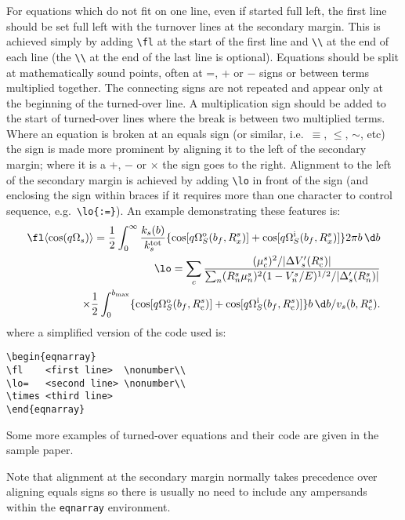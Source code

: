 For equations which do not fit on one line, even if started full left,
the first line should be set full left with the turnover lines at the
secondary margin. This is achieved simply by adding \verb"\fl" at the start
of the first line and \verb"\\" at the end of each line (the \verb"\\"
at the
end of the last line is optional). Equations should be split at
mathematically sound points, often at =, + or $-$ signs or between
terms multiplied together. The connecting signs are not repeated and
appear only at the beginning of the turned-over line. A multiplication
sign should be added to the start of turned-over lines where the break
is between two multiplied terms. Where an equation is broken at an
equals sign (or similar, i.e.\ $\equiv$, $\le$, $\sim$, etc) the sign
is made more prominent by aligning it to the left of the secondary
margin; where it is a +, $-$ or $\times$ the sign goes to the right.
Alignment to the left of the secondary margin is achieved by adding
\verb"\lo" in front of the sign (and enclosing the sign within braces if it
requires more than one character to control sequence, e.g.\
\verb"\lo{:=}"). An example demonstrating these features is:
\begin{eqnarray}
\fl\langle\cos(q\Omega_s)\rangle=\frac12\int^\infty_0
\frac{k_s(b)}{k^{\rm tot}_s}\{\cqo{o}{x}+\cqo{i}{x}\}
2\pi b\, \d b\nonumber\\
\lo=\sum_c{(\mu^s_c)^2/\vert\Delta V'_s(R^s_{\rm c})\vert \over \sum_n
(R^s_n\mu^s_n)^2(1-V^s_n/E)^{1/2}/\vert\Delta'_s(R^s_n)\vert}\nonumber\\
\times \frac12\int^{b_{\rm max}}_0 \{\cqo{o}{\rm c}+\cqo{i}{\rm c}\}
b\, \d b/v_s(b,R^s_{\rm c}).
\end{eqnarray}
where a simplified version of the
code used is:
\begin{verbatim}
\begin{eqnarray}
\fl    <first line>  \nonumber\\
\lo=   <second line> \nonumber\\
\times <third line>
\end{eqnarray}
\end{verbatim}
Some more examples of
turned-over equations and their code are given in the sample paper.

Note that alignment at the secondary margin normally takes
precedence over aligning equals signs so there is usually no need
to include any ampersands within the
\verb"eqnarray" environment.


